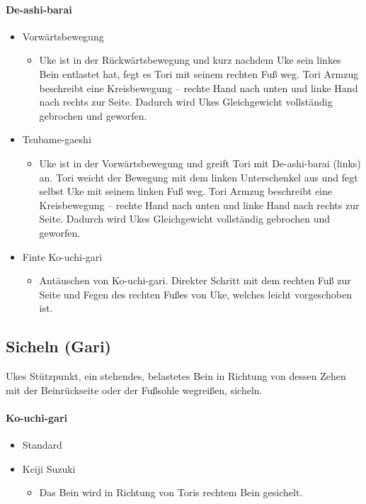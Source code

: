 \documentclass[justified, a4paper, notitlepage, captions=tableheading, nobib]{tufte-handout}
\begin{document}
\paragraph{De-ashi-barai }
\label{sec:org196df67}
\begin{itemize}
\item Vorwärtsbewegung
\begin{itemize}
\item Uke ist in der Rückwärtsbewegung und kurz nachdem Uke sein linkes Bein entlastet hat, fegt es Tori mit seinem rechten Fuß weg. Tori Armzug beschreibt eine Kreisbewegung – rechte Hand nach unten und linke Hand nach rechts zur Seite. Dadurch wird Ukes Gleichgewicht vollständig gebrochen und geworfen.
\end{itemize}
\item Tsubame-gaeshi
\begin{itemize}
\item Uke ist in der Vorwärtsbewegung und greift Tori mit De-ashi-barai (links) an. Tori weicht der Bewegung mit dem linken Unterschenkel aus und fegt selbst Uke mit seinem linken Fuß weg. Tori Armzug beschreibt eine Kreisbewegung – rechte Hand nach unten und linke Hand nach rechts zur Seite. Dadurch wird Ukes Gleichgewicht vollständig gebrochen und geworfen.
\end{itemize}
\item Finte Ko-uchi-gari
\begin{itemize}
\item Antäuschen von Ko-uchi-gari. Direkter Schritt mit dem rechten Fuß zur Seite und Fegen des rechten Fußes von Uke, welches leicht vorgeschoben ist.
\end{itemize}
\end{itemize}

\subsection{Sicheln (Gari) }
\label{sec:org64e8f12}
Ukes Stützpunkt, ein stehendes, belastetes Bein in Richtung von dessen Zehen mit der Beinrückseite oder der Fußsohle wegreißen, sicheln.

\paragraph{Ko-uchi-gari }
\label{sec:orgbc74aa9}
\begin{itemize}
\item Standard
\item Keiji Suzuki
\begin{itemize}
\item Das Bein wird in Richtung von Toris rechtem Bein gesichelt.
\end{itemize}
\end{itemize}
\end{document}
